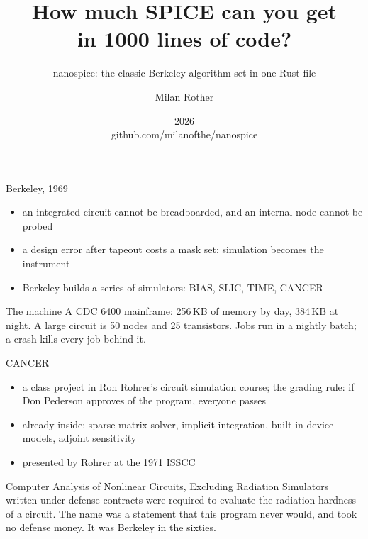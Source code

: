 \documentclass[11pt, aspectratio=169]{beamer}
\title{\textbf{How much SPICE can you get\\ in 1000 lines of code?}}
\subtitle{nanospice: the classic Berkeley algorithm set in one Rust file}
\author{Milan Rother}
\date{2026 \\[3mm] {\footnotesize github.com/milanofthe/nanospice}}
\begin{document}
\begin{frame}
\titlepage
\end{frame}

\begin{frame}{Berkeley, 1969}
\begin{itemize}
\item an integrated circuit cannot be breadboarded, and an internal node
      cannot be probed
\item a design error after tapeout costs a mask set: simulation becomes
      the instrument
\item Berkeley builds a series of simulators: BIAS, SLIC, TIME, CANCER
\end{itemize}
\vspace{3mm}
\begin{tile}{The machine}
A CDC 6400 mainframe: 256\,KB of memory by day, 384\,KB at night. A
large circuit is 50 nodes and 25 transistors. Jobs run in a nightly
batch; a crash kills every job behind it.
\end{tile}
\end{frame}

\begin{frame}{CANCER}
\begin{itemize}
\item a class project in Ron Rohrer's circuit simulation course; the
      grading rule: if Don Pederson approves of the program, everyone
      passes
\item already inside: sparse matrix solver, implicit integration,
      built-in device models, adjoint sensitivity
\item presented by Rohrer at the 1971 ISSCC
\end{itemize}
\vspace{3mm}
\begin{tile}{Computer Analysis of Nonlinear Circuits, Excluding Radiation}
Simulators written under defense contracts were required to evaluate the
radiation hardness of a circuit. The name was a statement that this
program never would, and took no defense money. It was Berkeley in the
sixties.
\end{tile}
\end{frame}
\end{document}
